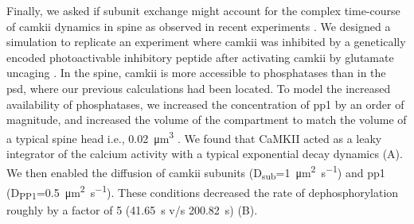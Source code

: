 \documentclass[9pt,lineno,doublespacing]{elife}
\newcommand\SUB[2]{#1\textsubscript{#2}}
\begin{document}
Finally, we asked if subunit exchange might account for the complex time-course
of \gls{camkii} dynamics in spine as observed in recent experiments
\citep{chang_camkii_2017}. We designed a simulation to replicate an experiment
where \gls{camkii} was inhibited by a genetically encoded photoactivable
inhibitory peptide after activating \gls{camkii} by glutamate uncaging
\citep{murakoshi_kinetics_2017}. In the spine, \gls{camkii} is more accessible
to phosphatases than in the \gls{psd}, where our previous calculations had been
located. To model the increased availability of phosphatases, we increased the
concentration of \gls{pp1} by an order of magnitude, and increased the volume of
the compartment to match the volume of a typical spine head i.e.,
\SI{0.02}{\cubic\micro\meter} \citep{bartol_nanoconnectomic_2015}. We found that
CaMKII acted as a leaky integrator of the calcium activity with a typical
exponential decay dynamics (A). We then enabled the
diffusion of \gls{camkii} subunits
(\SUB{D}{sub}=\SI{1}{\micro\meter\squared\per\second}) and \gls{pp1}
(\SUB{D}{PP1}=\SI{0.5}{\micro\meter\squared\per\second}). These conditions
decreased the rate of dephosphorylation roughly by a factor of 5
(\SI{41.65}{\second} v/s \SI{200.82}{\second}) (B). 
\end{document}

